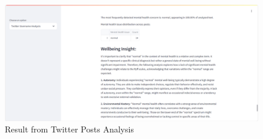 \begin{figure}[h!]  
    \centering
    \includegraphics[width=1.0\textwidth]{App Images/10 Interface.png}  
    \caption{Result from Twitter Posts Analysis}
    \label{10i}  %
\end{figure}


\pagebreak



